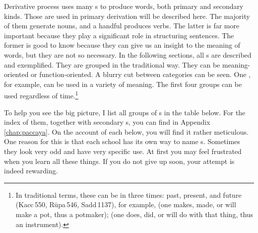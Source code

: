 Derivative process uses many s to produce words, both primary and secondary kinds. Those are used in primary derivation will be described here. The majority of them generate nouns, and a handful produces verbs. The latter is far more important because they play a significant role in structuring sentences. The former is good to know because they can give us an insight to the meaning of words, but they are not so necessary. In the following sections, all s are described and exemplified. They are grouped in the traditional way. They can be meaning-oriented or function-oriented. A blurry cut between categories can be seen. One ,  for example, can be used in a variety of meaning. The first four groups can be used regardless of time.\footnote{In traditional terms, these can be in three times: past, present, and future (Kacc\,550, R\=upa\,546, Sadd\,1137), for example,  (one makes, made, or will make a pot, thus a potmaker);  (one does, did, or will do with that thing, thus an instrument).}

To help you see the big picture, I list all groups of s in the table below. For the index of them, together with secondary s, you can find in Appendix \ref{chap:paccaya}. On the account of each  below, you will find it rather meticulous. One reason for this is that each school has its own way to name s. Sometimes they look very odd and have very specific use. At first you may feel frustrated when you learn all these things. If you do not give up soon, your attempt is indeed rewarding.

